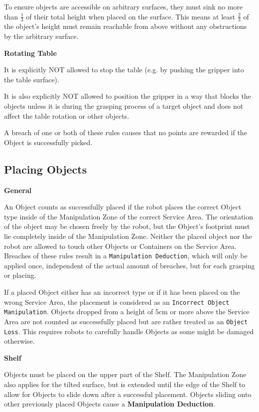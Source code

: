 To ensure objects are accessible on arbitrary surfaces, they must sink no more than $\frac{1}{3}$ of their total height when placed on the surface. This means at least $\frac{2}{3}$  of the object's height must remain reachable from above without any obstructions by the arbitrary surface.


\textbf{Rotating Table}

It is explicitly NOT allowed to stop the table (e.g. by pushing the gripper into the table surface).

It is also explicitly NOT allowed to position the gripper in a way that blocks the objects 
unless it is during the grasping process of a target object and does not affect the table rotation or other objects.

A breach of one or both of these rules causes that no points are rewarded if the Object is successfully picked.

\subsection{Placing Objects} \label{ssec:PlacingObjects}

\textbf{General}

An Object counts as successfully placed if the robot places the correct Object type inside of the Manipulation Zone of the correct Service Area. The orientation of the object may be chosen freely by the robot, but the Object's footprint must lie completely inside of the Manipulation Zone.
Neither the placed object nor the robot are allowed to touch other Objects or Containers on the Service Area.
Breaches of these rules result in a \texttt{Manipulation Deduction}, which will only be applied once, independent of the actual amount of breaches, but for each grasping or placing.

If a placed Object either has an incorrect type or if it has been placed on the wrong Service Area, 
the placement is considered as an \texttt{Incorrect Object Manipulation}. 
Objects dropped from a height of $5\si{\centi\meter}$ or more above the Service Area are not counted as successfully placed but are rather treated as an \texttt{Object Loss}. This requires robots to carefully handle Objects as some might be damaged otherwise.


\textbf{Shelf}

Objects must be placed on the upper part of the Shelf.
The Manipulation Zone also applies for the tilted surface, but is extended until the edge of the Shelf to allow for Objects to slide down after a successful placement. Objects sliding onto other previously placed Objects cause a \textbf{Manipulation Deduction}.

